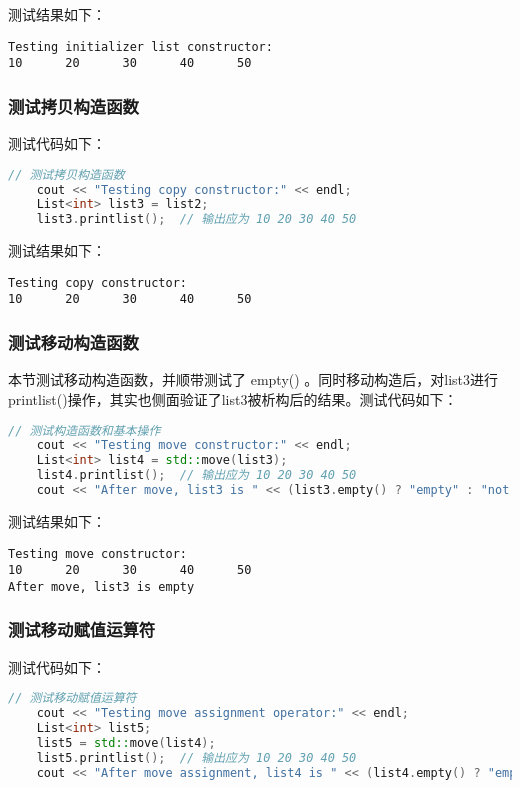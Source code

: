 \documentclass[fontset=fandol]{ctexart}
\begin{document}
测试结果如下：
\begin{verbatim}  
Testing initializer list constructor:
10      20      30      40      50 
\end{verbatim}  

\subsubsection{测试拷贝构造函数}
测试代码如下：
\begin{lstlisting}[language=C++, caption={测试拷贝构造函数}]  
// 测试拷贝构造函数
    cout << "Testing copy constructor:" << endl;  
    List<int> list3 = list2;  
    list3.printlist();  // 输出应为 10 20 30 40 50 
\end{lstlisting}

测试结果如下：
\begin{verbatim}  
Testing copy constructor:
10      20      30      40      50
\end{verbatim} 

\subsubsection{测试移动构造函数}
本节测试移动构造函数，并顺带测试了 empty() 。同时移动构造后，对list3进行printlist()操作，其实也侧面验证了list3被析构后的结果。测试代码如下：
\begin{lstlisting}[language=C++, caption={测试移动构造函数}]  
// 测试构造函数和基本操作  
    cout << "Testing move constructor:" << endl;  
    List<int> list4 = std::move(list3);  
    list4.printlist();  // 输出应为 10 20 30 40 50  
    cout << "After move, list3 is " << (list3.empty() ? "empty" : "not empty") << endl;  // 应为空
\end{lstlisting}

测试结果如下：
\begin{verbatim}  
Testing move constructor:
10      20      30      40      50
After move, list3 is empty
\end{verbatim}  

\subsubsection{测试移动赋值运算符}
测试代码如下：
\begin{lstlisting}[language=C++, caption={测试移动赋值运算符}]  
// 测试移动赋值运算符
    cout << "Testing move assignment operator:" << endl;  
    List<int> list5;  
    list5 = std::move(list4);  
    list5.printlist();  // 输出应为 10 20 30 40 50  
    cout << "After move assignment, list4 is " << (list4.empty() ? "empty" : "not empty") << endl;  // 应为空 
\end{lstlisting}
\end{document}
